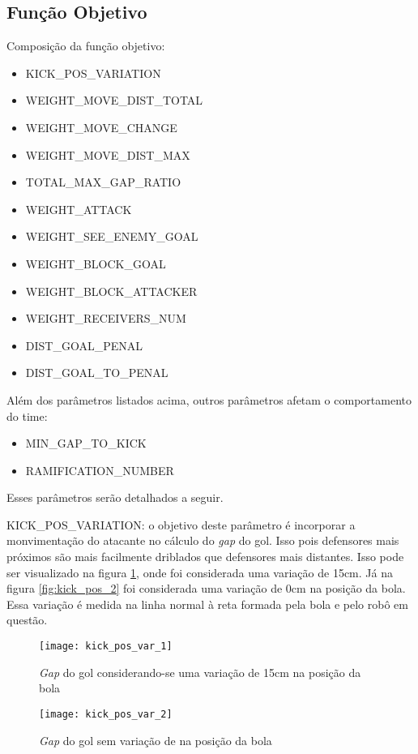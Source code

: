 \subsection{Função Objetivo}

Composição da função objetivo:
\begin{itemize}
  \item KICK{\_}POS{\_}VARIATION
  \item WEIGHT{\_}MOVE{\_}DIST{\_}TOTAL
  \item WEIGHT{\_}MOVE{\_}CHANGE
  \item WEIGHT{\_}MOVE{\_}DIST{\_}MAX
  \item TOTAL{\_}MAX{\_}GAP{\_}RATIO
  \item WEIGHT{\_}ATTACK
  \item WEIGHT{\_}SEE{\_}ENEMY{\_}GOAL
  \item WEIGHT{\_}BLOCK{\_}GOAL
  \item WEIGHT{\_}BLOCK{\_}ATTACKER
  \item WEIGHT{\_}RECEIVERS{\_}NUM
  \item DIST{\_}GOAL{\_}PENAL
  \item DIST{\_}GOAL{\_}TO{\_}PENAL
\end{itemize}

Além dos parâmetros listados acima, outros parâmetros
afetam o comportamento do time:
\begin{itemize}
  \item MIN{\_}GAP{\_}TO{\_}KICK
  \item RAMIFICATION{\_}NUMBER
\end{itemize}

Esses parâmetros serão detalhados a seguir.

KICK{\_}POS{\_}VARIATION: o objetivo deste parâmetro é incorporar a monvimentação
do atacante no cálculo do \textit{gap} do gol. Isso pois defensores mais
próximos são mais facilmente driblados que defensores mais distantes. Isso
pode ser visualizado na figura \ref{fig:kick_pos_1}, onde foi considerada
uma variação de 15cm. Já na figura \ref{fig:kick_pos_2} foi considerada uma
variação de 0cm na posição da bola. Essa variação é medida na linha normal
à reta formada pela bola e pelo robô em questão.

\begin{figure}[h]
  \centering
  \texttt{[image: kick\_pos\_var\_1]}
  \caption{\textit{Gap} do gol considerando-se uma variação de 15cm na 
           posição da bola}\label{fig:kick_pos_1}
  \texttt{[image: kick\_pos\_var\_2]}
  \caption{\textit{Gap} do gol sem variação de na posição da
           bola}\label{fig:kick_pos_1}
\end{figure}


